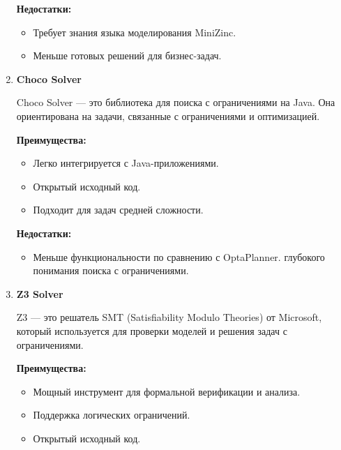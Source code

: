 \begin{enumerate}
\vspace{3mm}
\aim
\vspace{3mm}

\noindent \textbf{Недостатки:}
\begin{itemize}
\item Требует знания языка моделирования MiniZinc.
\item Меньше готовых решений для бизнес-задач.
\end{itemize}

\vspace{3mm}
\aim
\vspace{3mm} 

 \item \noindent \textbf {Choco Solver}

 Choco Solver — это библиотека для поиска с ограничениями на Java. Она ориентирована на задачи, связанные с ограничениями и оптимизацией.
\vspace{3mm}
\aim
\vspace{3mm} 

\noindent \textbf{Преимущества:}
\begin{itemize}
    \item Легко интегрируется с Java-приложениями.
    \item Открытый исходный код.
    \item Подходит для задач средней сложности.
\end{itemize}

\vspace{3mm}
\aim
\vspace{3mm}

\noindent \textbf{Недостатки:}
\begin{itemize}
\item Меньше функциональности по сравнению с OptaPlanner.
 глубокого понимания поиска с ограничениями.
\end{itemize}

\vspace{3mm}
\aim
\vspace{3mm} 

\item \noindent \textbf {Z3 Solver}

  Z3 — это решатель SMT (Satisfiability Modulo Theories) от Microsoft, который используется для проверки моделей и решения задач с ограничениями.
\vspace{3mm}
\aim
\vspace{3mm} 

\noindent \textbf{Преимущества:}
\begin{itemize}
    \item Мощный инструмент для формальной верификации и анализа.
    \item Поддержка логических ограничений.
    \item Открытый исходный код.
\end{itemize}


\end{enumerate}
